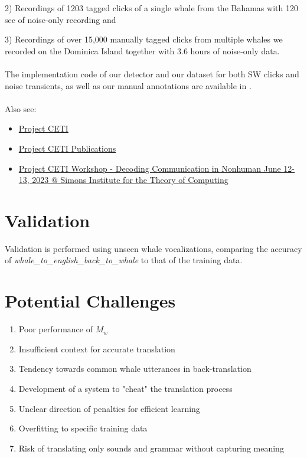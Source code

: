 \documentclass{article}
\begin{document}
2) Recordings of 1203 tagged clicks of a single whale from the Bahamas with 120 sec of noise-only recording and 

3) Recordings of over 15,000 manually tagged clicks from multiple whales we recorded on the Dominica Island together with 3.6 hours of noise-only data. \\ \\
The implementation code of our detector and our dataset for both SW clicks and noise transients, as well as our manual annotations are available in \cite{ceti}. \\ \\
Also see:
\begin{itemize}
    \item \href{https://www.projectceti.org/}{Project CETI}
    \item \href{https://www.projectceti.org/news-research-insights#publications}{Project CETI Publications}
    \item \href{https://www.youtube.com/playlist?list=PL-7Ju3RM0_oUKDIfBWlsOhONsXimWfMlF}{Project CETI Workshop - Decoding Communication in Nonhuman June 12-13, 2023 @ Simons Institute for the Theory of Computing}
\end{itemize}

\section{Validation}
Validation is performed using unseen whale vocalizations, comparing the accuracy of \textit{whale\_to\_english\_back\_to\_whale} to that of the training data.

\section{Potential Challenges}
\begin{enumerate}
    \item Poor performance of $M_w$
    \item Insufficient context for accurate translation
    \item Tendency towards common whale utterances in back-translation
    \item Development of a system to "cheat" the translation process
    \item Unclear direction of penalties for efficient learning
    \item Overfitting to specific training data
    \item Risk of translating only sounds and grammar without capturing meaning
\end{enumerate}
\end{document}

